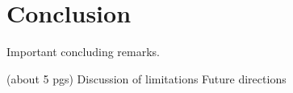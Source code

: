 
\chapter{Conclusion}
\label{chapter:conclusion}
Important concluding remarks.

 (about 5 pgs)
Discussion of limitations
Future directions
